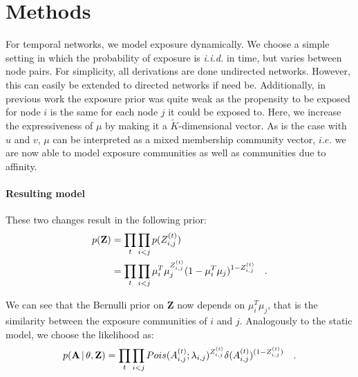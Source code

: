 \section{Methods}
For temporal networks, we model exposure dynamically. 
We choose a simple setting in which the probability of exposure is \textit{i.i.d.} in time, but varies 
between node pairs. For simplicity, all derivations are done undirected networks. 
However, this can easily be extended to directed networks if need be. 
Additionally, in previous work the exposure prior was quite weak as the propensity to be exposed for node $i$ is the same for each node $j$
it could be exposed to. Here, we increase the expressiveness of $\mu$ by making it a $\tilde{K}$-dimensional vector. 
As is the case with $u$ and $v$, $\mu$ can be interpreted as a mixed membership community vector, $\textit{i.e.}$
we are now able to model exposure communities as well as communities due to affinity.\\

\paragraph{Resulting model}
These two changes result in the following prior: 
\begin{equation}\label{eqn:expMarkov}
    \begin{aligned}
        p(\textbf{Z}) &= \prod_t \prod_{i<j} p(Z_{i,j}^{(t)}) \\
                      &= \prod_t \prod_{i<j} \mu_i^T \mu_j^{Z_{i,j}^{(t)}} (1-\mu_i^T \mu_j)^{1-Z_{i,j}^{(t)}}\quad.
    \end{aligned}      
\end{equation}

We can see that the Bernulli prior on \textbf{Z} now depends on $\mu_i^T \mu_j$, that is the similarity between the exposure communities
of $i$ and $j$. 
Analogously to the static model, we choose the likelihood as:
\begin{equation}
    \begin{aligned}
        p(\textbf{A} \,|\, \theta, \textbf{Z}) = \prod_t \prod_{i<j} Pois(A_{i,j}^{(t)} ; \lambda_{i,j})^{Z_{i,j}^{(t)}} \delta(A_{i,j}^{(t)})^{(1-Z_{i,j}^{(t)})}\quad.
    \end{aligned}      
\end{equation}
